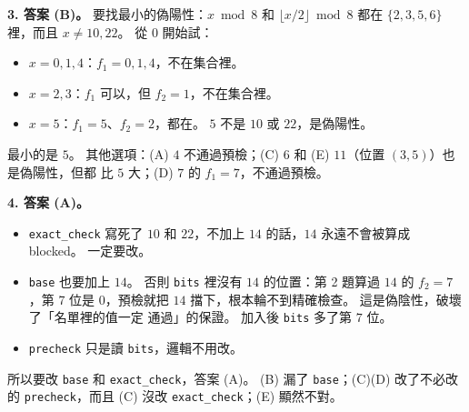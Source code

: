 \begin{pastsoln}
\textbf{3. 答案 (B)。} 要找最小的偽陽性：$x \bmod 8$ 和 $\lfloor x/2 \rfloor \bmod 8$ 都在
$\{2, 3, 5, 6\}$ 裡，而且 $x \ne 10, 22$。 從 $0$ 開始試：
\begin{itemize}
\item $x = 0, 1, 4$：$f_1 = 0, 1, 4$，不在集合裡。
\item $x = 2, 3$：$f_1$ 可以，但 $f_2 = 1$，不在集合裡。
\item $x = 5$：$f_1 = 5$、$f_2 = 2$，都在。 $5$ 不是 $10$ 或 $22$，是偽陽性。
\end{itemize}
最小的是 $5$。 其他選項：(A) $4$ 不通過預檢；(C) $6$ 和 (E) $11$（位置 $(3, 5)$）也是偽陽性，但都
比 $5$ 大；(D) $7$ 的 $f_1 = 7$，不通過預檢。

\textbf{4. 答案 (A)。}
\begin{itemize}
\item \texttt{exact\_check} 寫死了 $10$ 和 $22$，不加上 $14$ 的話，$14$ 永遠不會被算成 blocked。 一定要改。
\item \texttt{base} 也要加上 $14$。 否則 \texttt{bits} 裡沒有 $14$ 的位置：第 2 題算過 $14$ 的
$f_2 = 7$，第 7 位是 $0$，預檢就把 $14$ 擋下，根本輪不到精確檢查。 這是偽陰性，破壞了「名單裡的值一定
通過」的保證。 加入後 \texttt{bits} 多了第 $7$ 位。
\item \texttt{precheck} 只是讀 \texttt{bits}，邏輯不用改。
\end{itemize}
所以要改 \texttt{base} 和 \texttt{exact\_check}，答案 (A)。 (B) 漏了 \texttt{base}；(C)(D) 改了不必改的
\texttt{precheck}，而且 (C) 沒改 \texttt{exact\_check}；(E) 顯然不對。
\end{pastsoln}
